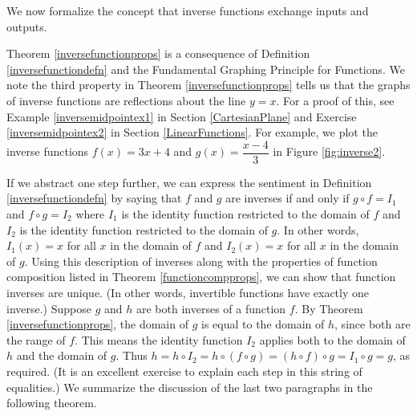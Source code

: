 \smallskip

We now formalize the concept that inverse functions exchange inputs and outputs.

\smallskip


\smallskip

Theorem \ref{inversefunctionprops} is a consequence of Definition \ref{inversefunctiondefn} and the Fundamental Graphing Principle for Functions.  We note the third property in Theorem \ref{inversefunctionprops} tells us that the graphs of inverse functions are reflections about the line $y=x$.  For a proof of this, see Example \ref{inversemidpointex1} in Section \ref{CartesianPlane} and Exercise \ref{inversemidpointex2} in Section \ref{LinearFunctions}.  For example, we plot the inverse functions $f(x) = 3x+4$ and $g(x) = \dfrac{x-4}{3}$ in Figure \ref{fig:inverse2}.



If we abstract one step further, we can express the sentiment in Definition \ref{inversefunctiondefn} by saying that $f$ and $g$ are inverses if and only if  $g \circ f = I_{1}$ and $f \circ g = I_{2}$ where $I_{1}$ is the identity function restricted to the domain of $f$ and $I_{2}$ is the identity function restricted to the domain of $g$.  In other words, $I_{1}(x) = x$ for all $x$ in the domain of $f$ and $I_{2}(x) = x$ for all $x$ in the domain of $g$.   Using this description of inverses along with the properties of function composition listed in Theorem  \ref{functioncompprops}, we can show that function inverses are unique. (In other words, invertible functions have exactly one inverse.)  Suppose $g$ and $h$ are both inverses of a function $f$. By Theorem \ref{inversefunctionprops}, the domain of $g$ is equal to the domain of $h$, since both are the range of $f$.  This means the identity function $I_{2}$ applies both to the domain of $h$ and the domain of $g$.  Thus $h = h \circ I_{2} = h \circ (f \circ g) = (h \circ f) \circ g = I_{1} \circ g = g$, as required. (It is an excellent exercise to explain each step in this string of equalities.)  We summarize the discussion of the last two paragraphs in the following theorem.

